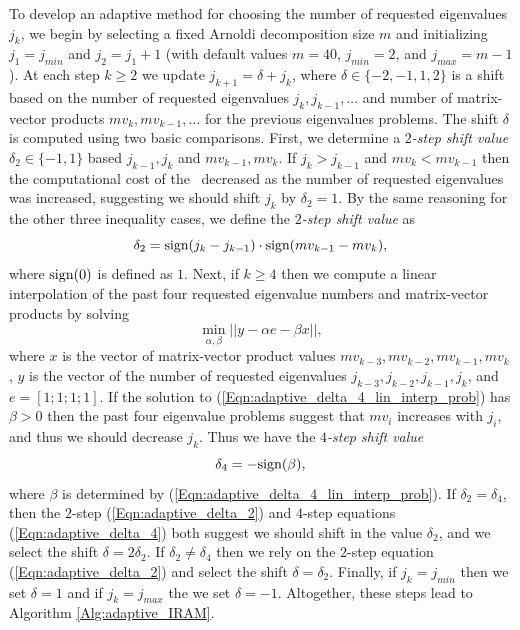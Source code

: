 \begin{enumerate}
To develop an adaptive method for choosing the number of requested eigenvalues $j_k$, we begin by selecting a fixed Arnoldi decomposition size $m$ and initializing $j_1=j_{min}$ and $j_2 = j_1+1$ (with default values $m=40$, $j_{min}=2$, and $j_{max} = m-1$).
At each step $k \geq 2$ we update $j_{k+1} = \delta + j_k$, where $\delta \in \{-2, -1, 1, 2\}$ is a shift based on the number of requested eigenvalues $j_k, j_{k-1}, \ldots$ and number of matrix-vector products $mv_k, mv_{k-1}, \ldots$ for the previous eigenvalues problems.
The shift $\delta$ is computed using two basic comparisons.
First, we determine a \textit{$2$-step shift value} $\delta_2 \in \{-1, 1\}$ based $j_{k-1}, j_k$ and $mv_{k-1}, mv_k$.
If $j_k > j_{k-1}$ and $mv_k < mv_{k-1}$ then the computational cost of the \emep \ decreased as the number of requested eigenvalues was increased, suggesting we should shift $j_k$ by $\delta_2 = 1$.
By the same reasoning for the other three inequality cases, we define the
\textit{$2$-step shift value} as
\begin{equation}				\label{Eqn:adaptive_delta_2}
\delta_2 = \textnormal{sign}(j_k - j_{k-1}) \cdot \textnormal{sign}(mv_{k-1} - mv_k),
\end{equation}
where $\textnormal{sign}(0)$ is defined as $1$.
Next, if $k \geq 4$ then we compute a linear interpolation of the past four requested eigenvalue numbers and matrix-vector products by solving
\begin{equation} 			\label{Eqn:adaptive_delta_4_lin_interp_prob}
\min_{\alpha, \beta} || y - \alpha e - \beta x ||,
\end{equation}
where $x$ is the vector of matrix-vector product values $mv_{k-3}, mv_{k-2}, mv_{k-1}, mv_k$, $y$ is the vector of the number of requested eigenvalues $j_{k-3}, j_{k-2}, j_{k-1}, j_k$, and $e = [1;1;1;1]$.
If the solution to (\ref{Eqn:adaptive_delta_4_lin_interp_prob}) has $\beta > 0$ then the past four eigenvalue problems suggest that $mv_i$ increases with $j_i$, and thus we should decrease $j_k$.
Thus we have the \textit{$4$-step shift value}
\begin{equation}			\label{Eqn:adaptive_delta_4}
\delta_4 = -\textnormal{sign}(\beta),
\end{equation}
where $\beta$ is determined by (\ref{Eqn:adaptive_delta_4_lin_interp_prob}).
If $\delta_2 = \delta_4$, then the $2$-step (\ref{Eqn:adaptive_delta_2}) and $4$-step equations (\ref{Eqn:adaptive_delta_4}) both suggest we should shift in the value $\delta_2$, and we select the shift $\delta = 2\delta_2$.
If $\delta_2 \neq \delta_4$ then we rely on the $2$-step equation (\ref{Eqn:adaptive_delta_2}) and select the shift $\delta = \delta_2$.
Finally, if $j_k = j_{min}$ then we set $\delta = 1$ and if $j_k = j_{max}$ the we set $\delta = -1$.
Altogether, these steps lead to Algorithm \ref{Alg:adaptive_IRAM}.





\end{enumerate}

